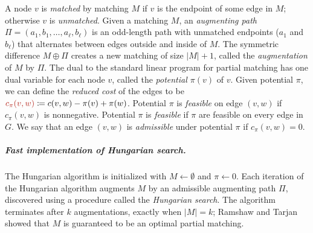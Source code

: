 \documentclass[a4paper,UKenglish]{socg-lipics-v2019}
\makeatletter
\def\abs#1{\mathopen| #1 \mathclose|}		%
\theoremstyle{plain}
\numberwithin{figure}{section}
\renewcommand{\paragraph}{\subparagraph}
\def\EMPH#1{\textcolor{BrickRed}{{\emph{#1}}}}
\def\n@te#1{\textsf{\boldmath \textbf{$\langle\!\langle$#1$\rangle\!\rangle$}}\leavevmode}
\def\note#1{\textcolor{red}{\n@te{#1}}}
\makeatother
\begin{document}
A node $v$ is \EMPH{matched} by matching $M$ if $v$ is the endpoint of some edge in $M$;
otherwise $v$ is \EMPH{unmatched}.
Given a matching $M$, an \EMPH{augmenting path}
$\Pi = (a_1, b_1, \ldots, a_\ell, b_\ell)$ is an odd-length path with unmatched
endpoints ($a_1$ and $b_\ell$) that alternates between edges outside and inside of $M$.
The symmetric difference $M \oplus \Pi$ creates a new matching of size $\abs{M}+1$, called the \EMPH{augmentation} of $M$ by $\Pi$.
%
The dual to the standard linear program for partial matching has one dual variable
for each node $v$, called the \EMPH{potential $\pi(v)$} of $v$.
Given potential $\pi$, we can define the \EMPH{reduced cost} of the edges to be
$\EMPH{$c_\pi(v, w)$} \coloneqq c(v, w) - \pi(v) + \pi(w)$.
Potential $\pi$ is \EMPH{feasible} on edge $(v,w)$ if $c_\pi(v, w)$ is nonnegative.
Potential $\pi$ is \EMPH{feasible} if $\pi$ are feasible on every edge in $G$.
We say that an edge $(v, w)$ is \EMPH{admissible} under potential $\pi$ if $c_\pi(v, w) = 0$.

\paragraph{Fast implementation of Hungarian search.}

The Hungarian algorithm is initialized with $M \gets \emptyset$ and $\pi \gets 0$.
Each iteration of the Hungarian algorithm augments $M$ by an admissible
augmenting path $\Pi$, discovered using a procedure called the
\EMPH{Hungarian search}.
The algorithm terminates after $k$ augmentations, exactly when $\abs{M} = k$;
Ramshaw and Tarjan~\cite{RT12} showed that $M$ is guaranteed to be an optimal partial matching.
\end{document}
